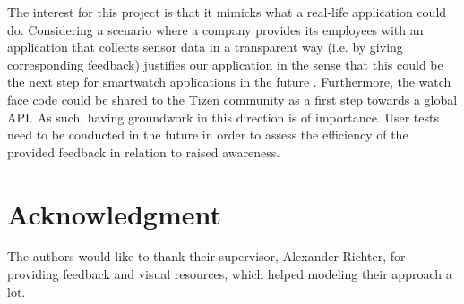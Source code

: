 \documentclass[conference, a4paper, 10pt, twocolumn]{IEEEtran}
\begin{document}
The interest for this project is that it mimicks what a real-life application could do. Considering a scenario where a company provides its employees with an application that collects sensor data in a transparent way (i.e. by giving corresponding feedback) justifies our application in the sense that this could be the next step for smartwatch applications in the future \cite{richter2020privacy}. Furthermore, the watch face code could be shared to the Tizen community as a first step towards a global \ac{API}. As such, having groundwork in this direction is of importance. User tests need to be conducted in the future in order to assess the efficiency of the provided feedback in relation to raised awareness. 

\section*{\textbf{Acknowledgment}}
The authors would like to thank their supervisor, Alexander Richter, for providing feedback and visual resources, which helped modeling their approach a lot.

\printbibliography
\end{document}
